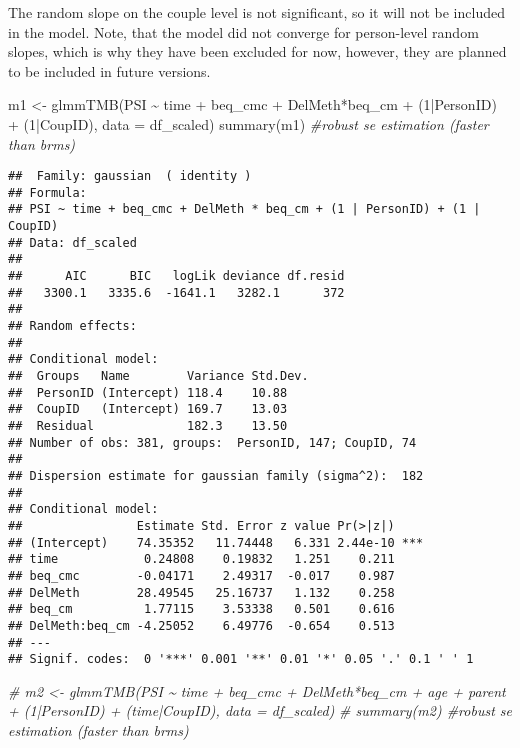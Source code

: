 \documentclass[
]{article}
\newenvironment{Shaded}{\begin{snugshade}}{\end{snugshade}}
\newcommand{\AttributeTok}[1]{\textcolor[rgb]{0.77,0.63,0.00}{#1}}
\newcommand{\CommentTok}[1]{\textcolor[rgb]{0.56,0.35,0.01}{\textit{#1}}}
\newcommand{\DecValTok}[1]{\textcolor[rgb]{0.00,0.00,0.81}{#1}}
\newcommand{\FunctionTok}[1]{\textcolor[rgb]{0.00,0.00,0.00}{#1}}
\newcommand{\NormalTok}[1]{#1}
\newcommand{\OtherTok}[1]{\textcolor[rgb]{0.56,0.35,0.01}{#1}}
\newcommand{\SpecialCharTok}[1]{\textcolor[rgb]{0.00,0.00,0.00}{#1}}
\begin{document}
The random slope on the couple level is not significant, so it will not
be included in the model. Note, that the model did not converge for
person-level random slopes, which is why they have been excluded for
now, however, they are planned to be included in future versions.

\begin{Shaded}
\begin{Highlighting}[]
\NormalTok{m1 }\OtherTok{\textless{}{-}} \FunctionTok{glmmTMB}\NormalTok{(PSI }\SpecialCharTok{\textasciitilde{}}\NormalTok{ time }\SpecialCharTok{+}\NormalTok{ beq\_cmc  }\SpecialCharTok{+}\NormalTok{ DelMeth}\SpecialCharTok{*}\NormalTok{beq\_cm }\SpecialCharTok{+}\NormalTok{ (}\DecValTok{1}\SpecialCharTok{|}\NormalTok{PersonID) }\SpecialCharTok{+}\NormalTok{ (}\DecValTok{1}\SpecialCharTok{|}\NormalTok{CoupID), }\AttributeTok{data =}\NormalTok{ df\_scaled)}
\FunctionTok{summary}\NormalTok{(m1) }\CommentTok{\#robust se estimation (faster than brms)}
\end{Highlighting}
\end{Shaded}

\begin{verbatim}
##  Family: gaussian  ( identity )
## Formula:          
## PSI ~ time + beq_cmc + DelMeth * beq_cm + (1 | PersonID) + (1 |      CoupID)
## Data: df_scaled
## 
##      AIC      BIC   logLik deviance df.resid 
##   3300.1   3335.6  -1641.1   3282.1      372 
## 
## Random effects:
## 
## Conditional model:
##  Groups   Name        Variance Std.Dev.
##  PersonID (Intercept) 118.4    10.88   
##  CoupID   (Intercept) 169.7    13.03   
##  Residual             182.3    13.50   
## Number of obs: 381, groups:  PersonID, 147; CoupID, 74
## 
## Dispersion estimate for gaussian family (sigma^2):  182 
## 
## Conditional model:
##                Estimate Std. Error z value Pr(>|z|)    
## (Intercept)    74.35352   11.74448   6.331 2.44e-10 ***
## time            0.24808    0.19832   1.251    0.211    
## beq_cmc        -0.04171    2.49317  -0.017    0.987    
## DelMeth        28.49545   25.16737   1.132    0.258    
## beq_cm          1.77115    3.53338   0.501    0.616    
## DelMeth:beq_cm -4.25052    6.49776  -0.654    0.513    
## ---
## Signif. codes:  0 '***' 0.001 '**' 0.01 '*' 0.05 '.' 0.1 ' ' 1
\end{verbatim}

\begin{Shaded}
\begin{Highlighting}[]
\CommentTok{\# m2 \textless{}{-} glmmTMB(PSI \textasciitilde{} time + beq\_cmc  + DelMeth*beq\_cm + age + parent + (1|PersonID) + (time|CoupID), data = df\_scaled)}
\CommentTok{\# summary(m2) \#robust se estimation (faster than brms)}
\end{Highlighting}
\end{Shaded}
\end{document}
